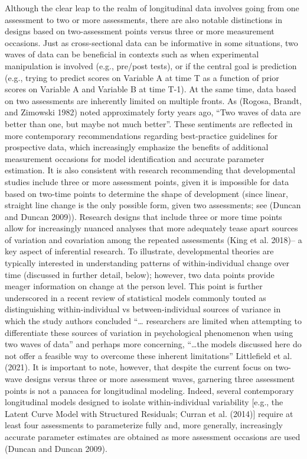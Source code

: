 \documentclass[
  letterpaper,
  DIV=11,
  numbers=noendperiod]{scrartcl}
\begin{document}
Although the clear leap to the realm of longitudinal data involves going
from one assessment to two or more assessments, there are also notable
distinctions in designs based on two-assessment points versus three or
more measurement occasions. Just as cross-sectional data can be
informative in some situations, two waves of data can be beneficial in
contexts such as when experimental manipulation is involved (e.g.,
pre/post tests), or if the central goal is prediction (e.g., trying to
predict scores on Variable A at time T as a function of prior scores on
Variable A and Variable B at time T-1). At the same time, data based on
two assessments are inherently limited on multiple fronts. As (Rogosa,
Brandt, and Zimowski 1982) noted approximately forty years ago, ``Two
waves of data are better than one, but maybe not much better''. These
sentiments are reflected in more contemporary recommendations regarding
best-practice guidelines for prospective data, which increasingly
emphasize the benefits of additional measurement occasions for model
identification and accurate parameter estimation. It is also consistent
with research recommending that developmental studies include three or
more assessment points, given it is impossible for data based on
two-time points to determine the shape of development (since linear,
straight line change is the only possible form, given two assessments;
see (Duncan and Duncan 2009)). Research designs that include three or
more time points allow for increasingly nuanced analyses that more
adequately tease apart sources of variation and covariation among the
repeated assessments (King et al. 2018)-- a key aspect of inferential
research. To illustrate, developmental theories are typically interested
in understanding patterns of within-individual change over time
(discussed in further detail, below); however, two data points provide
meager information on change at the person level. This point is further
underscored in a recent review of statistical models commonly touted as
distinguishing within-individual vs between-individual sources of
variance in which the study authors concluded ``\ldots{} researchers are
limited when attempting to differentiate these sources of variation in
psychological phenomenon when using two waves of data'' and perhaps more
concerning, ``\ldots the models discussed here do not offer a feasible
way to overcome these inherent limitations'' Littlefield et al. (2021).
It is important to note, however, that despite the current focus on
two-wave designs versus three or more assessment waves, garnering three
assessment points is not a panacea for longitudinal modeling. Indeed,
several contemporary longitudinal models designed to isolate
within-individual variability {[}e.g., the Latent Curve Model with
Structured Residuals; Curran et al. (2014){]} require at least four
assessments to parameterize fully and, more generally, increasingly
accurate parameter estimates are obtained as more assessment occasions
are used (Duncan and Duncan 2009).
\end{document}
